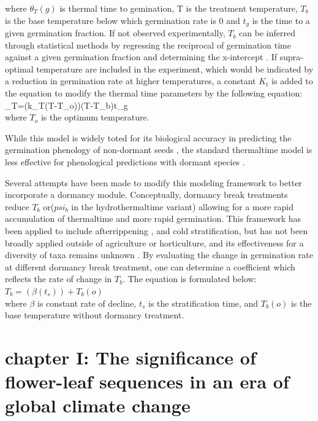 \documentclass{article}\usepackage[]{graphicx}\usepackage[]{color}
\begin{document}
where $\theta_{T}(g)$ is thermal time to gemination, T is the treatment temperature, $T_b$ is the base temperature below which germination rate is 0 and $t_g$ is the time to a given germination fraction. If not observed experimentally, $T_b$ can be inferred through statistical methods by regressing the reciprocal of germination time against a given germination fraction and determining the x-intercept \citep{Pritchard1999}.
If supra-optimal temperature are included in the experiment, which would be indicated by a reduction in germination rate at higher temperatures, a constant $K_t$ is added to the equation to modify the thermal time parameters by the following equation:\\

\theta_{T}=(k_{T}(T-T_{o}))(T-T_{b})t_{g}\\

where $T_o$ is the optimum temperature.
\par While this model is widely toted for its biological accuracy in predicting the germination phenology of non-dormant seeds \citep{Bradford2005}, the standard thermaltime model is less effective for phenological predictions with dormant species \citep{Batlla2015}.
\par Several attempts have been made to modify this modeling framework to better incorporate a dormancy module. Conceptually, dormancy break treatments reduce $T_b$ or($psi_b$ in the hydrothermaltime variant) allowing for a more rapid accumulation of thermaltime and more rapid germination. This framework has been applied to include afterrippening \citep{Meyer2000}, and cold stratification\citep{Pritchard1996,Batlla2003}, but has not been broadly applied outside of agriculture or horticulture, and its effectiveness for a diversity of taxa remains unknown \citep{Steadman2004}. By evaluating the change in germination rate at different dormancy break treatment, one can determine a coefficient which reflects the rate of change in $T_b$. The equation is formulated below:\\

$T_b= (\beta(t_s))+T_b(o)$\\

where $\beta$ is constant rate of decline, $t_s$ is the stratification time, and $T_b(o)$ is the base temperature without dormancy treatment.

\section*{chapter I: The significance of flower-leaf sequences in an era of global climate change}
\end{document}
